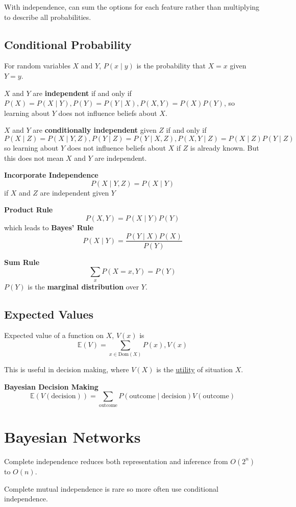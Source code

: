 \documentclass[11pt]{article}
\begin{document}
With independence, can sum the options for each feature rather than multiplying to describe
all probabilities.
\subsection{Conditional Probability}
\label{sec:org67f84aa}
For random variables \(X\) and \(Y\),
\(P(x \mid y)\) is the probability that \(X = x\) given \(Y = y\).

\(X\) and \(Y\) are \textbf{independent} if and only if \(P(X) = P(X \mid Y), P(Y) = P(Y \mid X), P(X,Y) = P(X)P(Y)\),
so learning about \(Y\) does not influence beliefs about \(X\).

\(X\) and \(Y\) are \textbf{conditionally independent} given \(Z\) if and only if
\(P(X \mid Z) = P(X \mid Y, Z), P(Y \mid Z) = P(Y \mid X, Z), P(X, Y \mid Z) = P(X \mid Z) P(Y \mid Z)\)
so learning about \(Y\) does not influence beliefs about \(X\) if \(Z\) is already known.
But this does not mean \(X\) and \(Y\) are independent.

\textbf{Incorporate Independence}
$$ P(X \mid Y, Z) = P(X \mid Y) $$
if \(X\) and \(Z\) are independent given \(Y\)

\textbf{Product Rule}
$$ P(X,Y) = P(X \mid Y) P (Y) $$
which leads to \textbf{Bayes' Rule}
$$ P(X \mid Y) = \frac{P(Y \mid X) P(X)}{P(Y)} $$

\textbf{Sum Rule}
$$ \sum_{x} P(X = x, Y) = P(Y) $$
\(P(Y)\) is the \textbf{marginal distribution} over \(Y\).
\subsection{Expected Values}
\label{sec:org42ec887}
Expected value of a function on \(X\), \(V(x)\) is
$$ \mathds{E}(V) = \sum_{x \in \text{Dom}(X)} P(x), V(x) $$

This is useful in decision making, where \(V(X)\) is the \uline{utility} of situation \(X\).

\textbf{Bayesian Decision Making}
$$ \mathds{E}(V(\text{decision})) = \sum_{\text{outcome}} P(\text{outcome} \mid \text{decision}) V(\text{outcome}) $$
\section{Bayesian Networks}
\label{sec:orgee20d6d}
Complete independence reduces both representation and inference from \(O(2^{n})\) to \(O(n)\).

Complete mutual independence is rare so more often use conditional independence.
\end{document}
